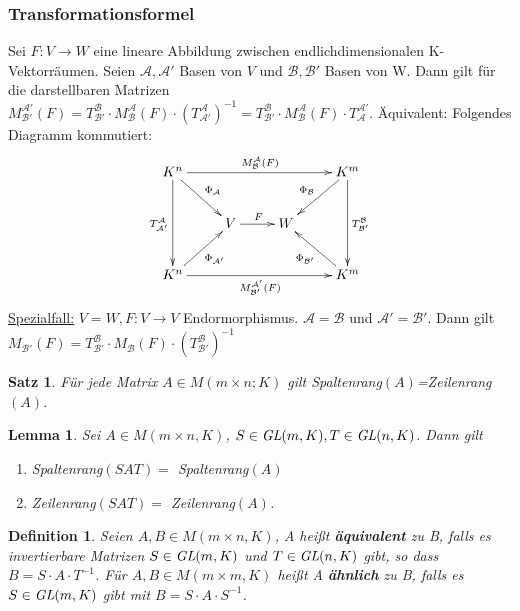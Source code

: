 \documentclass[12pt,a4paper]{article}
\theoremstyle{plain}
\newtheorem{Satz}[Theorem]{Satz}
\newtheorem{Lemma}[Theorem]{Lemma}
\newtheorem{Definition}[Theorem]{Definition}
\newcommand{\herv}[1]{{\emph{\textbf{#1}}}}
\numberwithin{equation}{section}
\begin{document}
\subsubsection{Transformationsformel}
Sei $F:V\rightarrow W$ eine lineare Abbildung zwischen endlichdimensionalen K-Vektorräumen. Seien $\mathcal{A},\mathcal{A'}$ Basen von $V$ und $\mathcal{B}, \mathcal{B'}$ Basen von W. Dann gilt für die darstellbaren Matrizen $M^\mathcal{A'}_\mathcal{B'}(F)=T^\mathcal{B}_\mathcal{B'}\cdot M^\mathcal{A}_\mathcal{B}(F)\cdot \left(T^\mathcal{A}_\mathcal{A'}\right)^{-1}=T^\mathcal{B}_\mathcal{B'}\cdot M^\mathcal{A}_\mathcal{B}(F)\cdot T^\mathcal{A'}_\mathcal{A}$. Äquivalent: Folgendes Diagramm kommutiert:
\[ \begin{xy}
	\xymatrix{
		K^n \ar[rrr]^{M^\mathcal{A}_\mathcal{B}(F)} \ar[dr]^{\Phi_\mathcal{A}} \ar[dd]_{T^\mathcal{A}_\mathcal{A'}} & & & K^m \ar[dl]_{\Phi_\mathcal{B}} \ar[dd]^{T^\mathcal{B}_\mathcal{B'}} \\
		&  V \ar[r]^F & W & \\
		K^n \ar[ur]_{\Phi_\mathcal{A'}} \ar[rrr]_{M^\mathcal{A'}_\mathcal{B'}(F)} & & & K^m \ar[ul]^{\Phi_\mathcal{B'}}
	}
\end{xy} \]
\underline{Spezialfall:} $V=W, F: V\rightarrow V$ Endormorphismus. $\mathcal{A}=\mathcal{B}$ und $\mathcal{A'}=\mathcal{B'}$. Dann gilt $M_\mathcal{B'}(F)=T^\mathcal{B}_\mathcal{B'}\cdot M_\mathcal{B}(F)\cdot\left( T^\mathcal{B}_\mathcal{B'}\right)^{-1}$
\begin{Satz}
Für jede Matrix $A\in M(m\times n;K)$ gilt Spaltenrang$(A)$=Zeilenrang$(A)$.
\end{Satz}
\begin{Lemma}
Sei $A\in M(m\times n,K)$, $S\in\emph{GL}(m,K), T\in\emph{GL}(n,K)$. Dann gilt \begin{enumerate}
\renewcommand{\labelenumi}{\emph{\arabic{enumi})}}
\item Spaltenrang$(SAT)=$ Spaltenrang$(A)$
\item Zeilenrang$(SAT)=$ Zeilenrang$(A)$.
\end{enumerate}
\end{Lemma}
\begin{Definition}
Seien $A,B\in M(m\times n, K)$, A heißt \herv{äquivalent} zu B, falls es invertierbare Matrizen $S\in \emph{GL}(m,K)$ und $T\in \emph{GL}(n,K)$ gibt, so dass $B=S\cdot A\cdot T^{-1}$. Für $A,B\in M(m\times m,K)$ heißt A \herv{ähnlich} zu B, falls es $S\in \emph{GL}(m,K)$ gibt mit $B=S\cdot A\cdot S^{-1}$.
\end{Definition}
\end{document}
